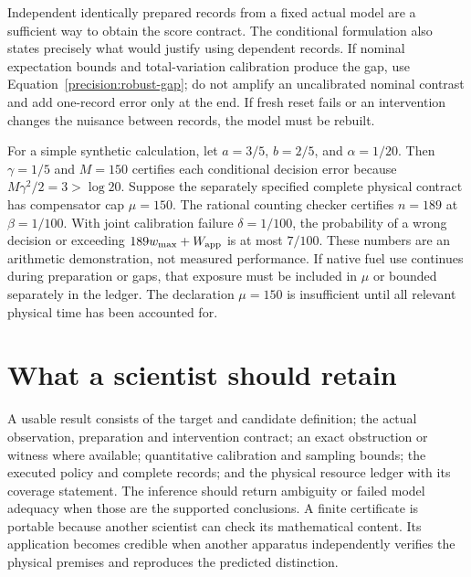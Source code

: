 Independent identically prepared records from a fixed actual model are a
sufficient way to obtain the score contract. The conditional formulation also
states precisely what would justify using dependent records. If nominal
expectation bounds and total-variation calibration produce the gap, use
Equation~\eqref{precision:robust-gap}; do not amplify an uncalibrated nominal
contrast and add one-record error only at the end. If fresh reset fails or an
intervention changes the nuisance between records, the model must be rebuilt.

For a simple synthetic calculation, let $a=3/5$, $b=2/5$, and $\alpha=1/20$.
Then $\gamma=1/5$ and $M=150$ certifies each conditional decision error because
$M\gamma^2/2=3>\log20$. Suppose the separately specified complete physical
contract has compensator cap $\mu=150$. The rational counting checker certifies
$n=189$ at $\beta=1/100$. With joint calibration failure $\delta=1/100$,
the probability of a wrong decision or exceeding
$189w_{\max}+W_{\rm app}$ is at most $7/100$.
These numbers are an arithmetic demonstration, not measured performance.
If native fuel use continues during preparation or gaps, that exposure must be
included in $\mu$ or bounded separately in the ledger. The declaration
$\mu=150$ is insufficient until all relevant physical time has been accounted for.

\section{What a scientist should retain}

A usable result consists of the target and candidate definition; the actual
observation, preparation and intervention contract; an exact obstruction or
witness where available; quantitative calibration and sampling bounds; the
executed policy and complete records; and the physical resource ledger with
its coverage statement. The inference should return ambiguity or failed model
adequacy when those are the supported conclusions. A finite certificate is
portable because another scientist can check its mathematical content. Its
application becomes credible when another apparatus independently verifies
the physical premises and reproduces the predicted distinction.
